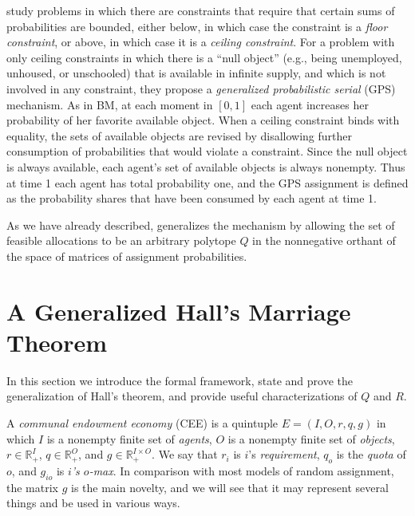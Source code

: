 \documentclass[12pt, A4paper]{article}
\theoremstyle{definition}
\renewcommand{\Re}{\mathbb{R}}
\begin{document}
\cite{bckm13aer} study problems in which there are constraints that require that certain sums of probabilities are bounded, either below, in which case the constraint is a \emph{floor constraint}, or above, in which case it is a \emph{ceiling constraint}.  For a problem with only ceiling constraints in which  there is a ``null object'' (e.g., being unemployed, unhoused, or unschooled) that is available in infinite supply, and which is not involved in any constraint, they propose a \emph{generalized probabilistic serial} (GPS) mechanism.  As in BM, at each moment in $[0,1]$ each agent increases her probability of her favorite available object.  When a ceiling constraint binds with equality, the sets of available objects are revised by disallowing further consumption of probabilities that would violate a constraint.  Since the null object is always available, each agent's set of available objects is always nonempty.  Thus at time 1 each agent has total probability one, and the GPS assignment is defined as the probability shares that have been consumed by each agent at time 1.

As we have already described, \cite{balbuzanov22jet} generalizes the \cite{bckm13aer} mechanism by allowing the set of feasible allocations to be an arbitrary polytope $Q$ in the nonnegative orthant of the space of matrices of assignment probabilities. 

\section{A Generalized Hall's Marriage Theorem} \label{sec:GenHall}

In this section we introduce the formal framework, state and prove the generalization of Hall's theorem, and provide useful characterizations of $Q$ and $R$.

A \emph{communal endowment economy} (CEE) is a quintuple $E = (I,O,r,q,g)$ in which $I$ is a nonempty finite set of \emph{agents}, $O$ is a nonempty finite set of \emph{objects}, $r \in \Re_+^I$, $q \in \Re_+^O$, and $g \in \Re_+^{I \times O}$.  We say that $r_i$ is
$i$'s \emph{requirement}, $q_o$ is the \emph{quota} of $o$, and $g_{io}$ is \emph{$i$'s $o$-max}.  In comparison with most models of random assignment, the matrix $g$ is the main novelty, and we will see that it may represent several things and be used in various ways. 
\end{document}
